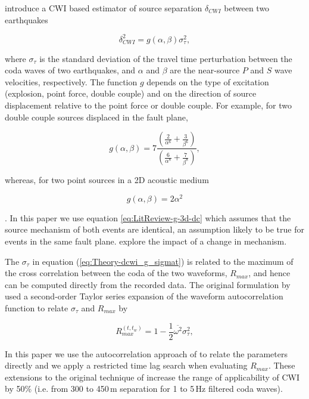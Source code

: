 \documentclass[12pt,double]{article}
\begin{document}
\citet{dr_Snieder05a} introduce a CWI based estimator of source
separation $\delta_{CWI}$ between two earthquakes
\begin{linenomath*} \begin{equation}
\label{eq:Theory-dcwi_g_sigmat}
\delta_{CWI}^2 = g(\alpha,\beta)\sigma_\tau^2,
\end{equation} \end{linenomath*}
where $\sigma_\tau$ is the standard deviation of the travel time
perturbation between the coda waves of two earthquakes, and $\alpha$
and $\beta$ are the near-source $P$ and $S$ wave velocities,
respectively. The function $g$ depends on the type of excitation
(explosion, point force, double couple) and on the direction of
source displacement relative to the point force or double couple.
For example, for two double couple sources displaced in the fault
plane,
\begin{linenomath*} \begin{equation}
\label{eq:LitReview-g-3d-dc}
g(\alpha,\beta) = 7
\frac{\left(\frac{2}{\alpha^6}+\frac{3}{\beta^6}\right)}{\left(\frac{6}{\alpha^8}+\frac{7}{\beta^8}\right)},
\end{equation} \end{linenomath*}
whereas, for two point sources in a 2D acoustic medium
\begin{linenomath*} \begin{equation}
\label{eq:LitReview-g-2d-ps} g(\alpha,\beta) = 2 \alpha^2
\end{equation} \end{linenomath*}
\citep{dr_Snieder05a}. In this paper we use equation
\ref{eq:LitReview-g-3d-dc} which assumes that the source mechanism
of both events are identical, an assumption likely to be true for
events in the same fault plane. \cite{dr_Robinson07c} explore the
impact of a change in mechanism.

The $\sigma_\tau$ in equation (\ref{eq:Theory-dcwi_g_sigmat}) is
related to the maximum of the cross correlation between the coda of
the two waveforms, $R_{max}$, and hence can be computed directly
from the recorded data. The original formulation by
\citet{dr_Snieder05a} used a second-order Taylor series expansion of
the waveform autocorrelation function to relate $\sigma_\tau$ and
$R_{max}$ by
\begin{linenomath*} \begin{equation}
\label{eq:Rmax-disp-orig} R_{max}^{(t,t_w)} = 1 - \frac{1}{2}
\overline{\omega^2} \sigma_\tau^2,
\end{equation} \end{linenomath*}
In this paper we use the autocorrelation approach of
\citet{dr_Robinson11a} to relate the parameters directly and we
apply a restricted time lag search when evaluating $R_{max}$. These
extensions to the original technique of \citet{dr_Snieder05a}
increase the range of applicability of CWI by 50\% (i.e. from 300 to
450\,m separation for 1 to 5\,Hz filtered coda waves).
\end{document}
